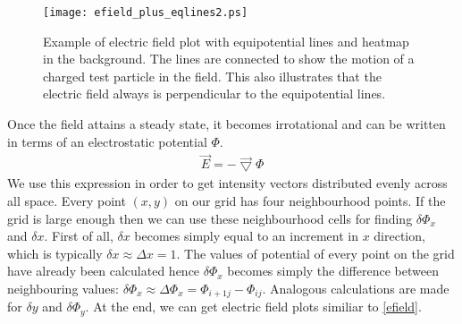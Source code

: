 \documentclass[aps,twocolumn,pre,nofootinbib,10pt]{revtex4-1}
\begin{document}
\begin{figure}[h]
\begin{center}
\texttt{[image: efield\_plus\_eqlines2.ps]}
\caption{Example of electric field plot with equipotential lines and heatmap in the background. The lines are connected to show the motion of a charged test particle in the field. This also illustrates that the electric field always is perpendicular to the equipotential lines.}
\label{efieldlines}
\end{center}
\end{figure}

Once the field attains a steady state, it becomes irrotational and can be written in terms of an electrostatic potential \begin{math} \Phi \end{math}. \begin{gather*} \vec{E} = -\vec{\bigtriangledown}\Phi \end{gather*} We use this expression in order to get intensity vectors distributed evenly across all space. Every point \begin{math} (x,y) \end{math} on our grid has four neighbourhood points. If the grid is large enough then we can use these neighbourhood cells for finding \begin{math} \delta \Phi_x\end{math} and \begin{math} \delta x \end{math}. First of all, \begin{math} \delta x \end{math} becomes simply equal to an increment in \begin{math}x\end{math} direction, which is typically \begin{math} \delta x \approx \Delta x = 1 \end{math}. The values of potential of every point on the grid have already been calculated hence \begin{math} \delta \Phi_x \end{math} becomes simply the difference between neighbouring values: \begin{math} \delta \Phi_x \approx \Delta \Phi_x = \Phi_{i+1 j} - \Phi_{ij} \end{math}. 
Analogous calculations are made for \begin{math} \delta y \end{math} and \begin{math} \delta \Phi_y \end{math}. At the end, we can get electric field plots similiar to \ref{efield}.
\end{document}
